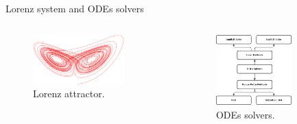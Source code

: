 \documentclass[aspectratio=169,xcolor=dvipsnames, t]{beamer}
\begin{document}
\begin{frame}{Lorenz system and ODEs solvers}

    \begin{columns}
\begin{column}{0.5\textwidth}
   \begin{figure}[ht!]
    \centering
    \includegraphics[width=0.8\textwidth]{figures/lorenz-attractor-112761.png}
    \caption{Lorenz attractor.}
    \label{fig:1}
\end{figure}
\end{column}
\begin{column}{0.5\textwidth}  %
    \begin{center}
     \begin{figure}[ht!]
    \centering
    \includegraphics[width=0.7\textwidth]{figures/ode.png}
    \caption{ODEs solvers.}
    \label{fig:1}
\end{figure}
     \end{center}
\end{column}
\end{columns}
    
\end{frame}
\end{document}
